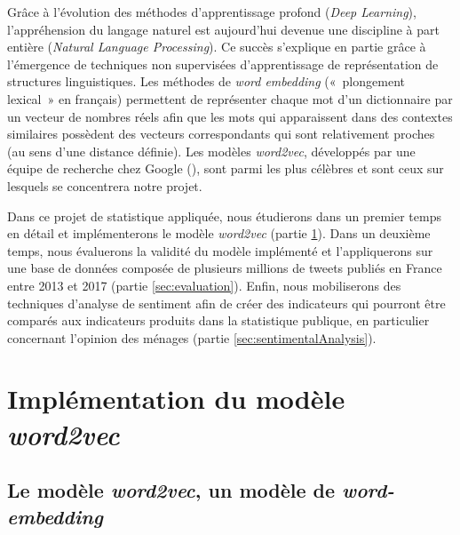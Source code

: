 \documentclass[11pt,french,french]{article}
\begin{document}
Grâce à l'évolution des méthodes d'apprentissage profond (\emph{Deep Learning}), l'appréhension du langage naturel est aujourd'hui devenue une discipline à part entière (\emph{Natural Language Processing}).
Ce succès s'explique en partie grâce à l'émergence de techniques non supervisées d'apprentissage de représentation de structures linguistiques.
Les méthodes de \emph{word embedding} («~plongement lexical~» en français) permettent de représenter chaque mot d'un dictionnaire par un vecteur de nombres réels afin que les mots qui apparaissent dans des contextes similaires possèdent des vecteurs correspondants qui sont relativement proches (au sens d'une distance définie).
Les modèles \emph{word2vec}, développés par une équipe de recherche chez Google (\cite{Mikolov}), sont parmi les plus célèbres et sont ceux sur lesquels se concentrera notre projet.

Dans ce projet de statistique appliquée, nous étudierons dans un premier temps en détail et implémenterons le modèle \emph{word2vec} (partie \ref{sec:word2vec}).
Dans un deuxième temps, nous évaluerons la validité du modèle implémenté et l'appliquerons sur une base de données composée de plusieurs millions de tweets publiés en France entre 2013 et 2017 (partie \ref{sec:evaluation}).
Enfin, nous mobiliserons des techniques d'analyse de sentiment afin de créer des indicateurs qui pourront être comparés aux indicateurs produits dans la statistique publique, en particulier concernant l'opinion des ménages (partie \ref{sec:sentimentalAnalysis}).

\bigskip

\bigskip

\begin{figure}[htb]

\end{figure}

\newpage

\hypertarget{sec:word2vec}{%
\section{\texorpdfstring{Implémentation du modèle \emph{word2vec}}{Implémentation du modèle word2vec}}\label{sec:word2vec}}

\hypertarget{le-moduxe8le-word2vec-un-moduxe8le-de-word-embedding}{%
\subsection{\texorpdfstring{Le modèle \emph{word2vec}, un modèle de \emph{word-embedding}}{Le modèle word2vec, un modèle de word-embedding}}\label{le-moduxe8le-word2vec-un-moduxe8le-de-word-embedding}}
\end{document}
